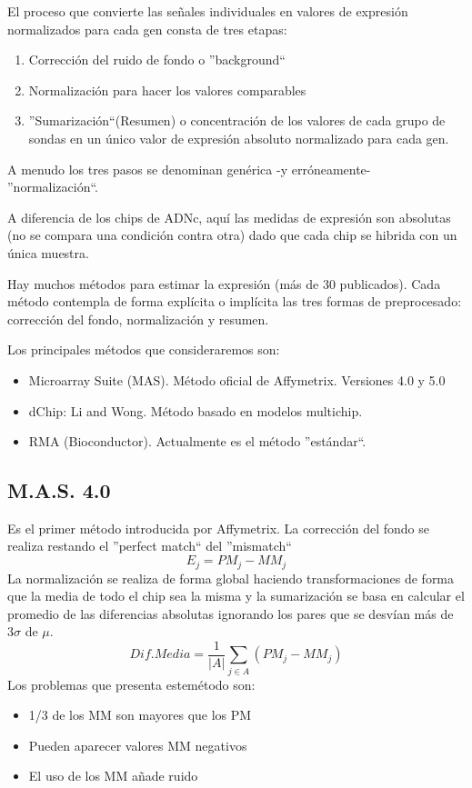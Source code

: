El proceso que convierte las se\~nales individuales en valores de expresi\'on normalizados para cada gen consta de tres etapas:
\begin{enumerate}
\item Correcci\'on del ruido de fondo o ''background``
\item Normalizaci\'on para hacer los valores comparables
\item ''Sumarizaci\'on``(Resumen) o concentraci\'on de los valores de cada grupo de sondas en un \'unico valor de expresi\'on absoluto normalizado
para cada gen.
\end{enumerate}
A menudo los tres pasos se denominan gen\'erica -y err\'oneamente- ''normalizaci\'on``.

A diferencia de los chips de ADNc, aqu\'i las medidas de expresi\'on son absolutas (no se compara una condici\'on contra otra)
dado que cada chip se hibrida con un \'unica muestra.

Hay muchos m\'etodos para estimar la expresi\'on (m\'as de 30 publicados).
Cada m\'etodo contempla de forma expl\'icita o impl\'icita las tres formas de preprocesado: correcci\'on del fondo,
normalizaci\'on y resumen.

Los principales m\'etodos que consideraremos son:
\begin{itemize}
\item Microarray Suite (MAS). M\'etodo oficial de Affymetrix. Versiones 4.0 y 5.0
\item dChip: Li and Wong. M\'etodo basado en modelos multichip.
\item RMA (Bioconductor). Actualmente es el m\'etodo ''est\'andar``.
\end{itemize}

\subsection{M.A.S. 4.0}

Es el primer m\'etodo introducida por Affymetrix.
La correcci\'on del fondo se realiza restando el ''perfect match`` del ''mismatch``
\begin{equation}
 E_j=PM_j-MM_j
\end{equation}
La normalizaci\'on se realiza de forma global haciendo transformaciones de forma que la media de todo el chip sea la misma y
la sumarizaci\'on se basa en calcular el promedio de las diferencias absolutas ignorando los pares que se desv\'ian m\'as de $3\sigma$ de $\mu$.
\begin{equation}
 Dif. Media=\frac{1}{|A|}\sum_{j \in A}(PM_j-MM_j)
\end{equation}
Los problemas que presenta estem\'etodo son:
\begin{itemize}
\item 1/3 de los MM son mayores que los PM
\item Pueden aparecer valores MM negativos
\item El uso de los MM a\~nade ruido
\end{itemize}


